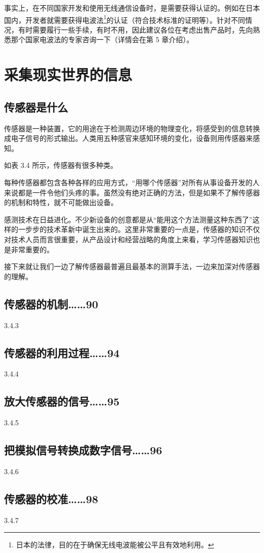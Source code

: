 \documentclass[12pt,UTF8]{ctexbook}
\begin{document}
事实上，在不同国家开发和使用无线通信设备时，是需要获得认证的。例如在日本国内，开发者就需要获得电波法\footnote{日本的法律，目的在于确保无线电波能被公平且有效地利用。}的认证（符合技术标准的证明等）。针对不同情况，有时需要履行一些手续，有时不用，因此建议各位在考虑出售产品时，先向熟悉那个国家电波法的专家咨询一下（详情会在第 5 章介绍）。

\section{采集现实世界的信息}

\subsection{传感器是什么}

传感器是一种装置，它的用途在于检测周边环境的物理变化，将感受到的信息转换成电子信号的形式输出。人类用五种感官来感知环境的变化，设备则用传感器来感知。

如表 3.4 所示，传感器有很多种类。

每种传感器都包含各种各样的应用方式，“用哪个传感器”对所有从事设备开发的人来说都是一件令他们头疼的事。虽然没有绝对正确的方法，但是如果不了解传感器的机制和特性，就不可能做出设备。

感测技术在日益进化。不少新设备的创意都是从“能用这个方法测量这种东西了”这样的一步步的技术革新中诞生出来的。这里非常重要的一点是，传感器的知识不仅对技术人员而言很重要，从产品设计和经营战略的角度上来看，学习传感器知识也是非常重要的。

接下来就让我们一边了解传感器最普遍且最基本的测算手法，一边来加深对传感器的理解。

\subsection{传感器的机制……90}
3.4.3
\subsection{传感器的利用过程……94}
3.4.4
\subsection{放大传感器的信号……95}
3.4.5
\subsection{把模拟信号转换成数字信号……96}
3.4.6
\subsection{传感器的校准……98}
3.4.7
\end{document}
